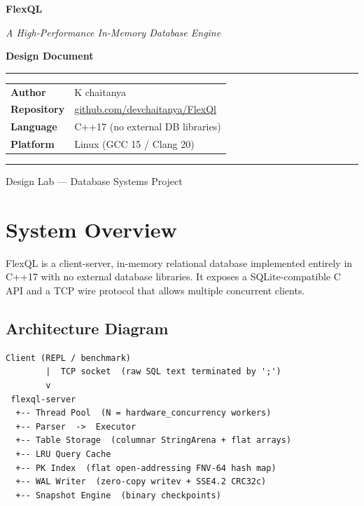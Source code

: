 \documentclass[12pt,a4paper]{article}
\begin{document}
\begin{titlepage}
\centering
\vspace*{3cm}
{\Huge\bfseries\color{sectiongray} FlexQL \par}
\vspace{0.4cm}
{\large\itshape A High-Performance In-Memory Database Engine \par}
\vspace{1.5cm}
{\normalsize\bfseries Design Document \par}
\vspace{0.5cm}
\hrule
\vspace{0.5cm}
{\small
\begin{tabular}{ll}
\textbf{Author}     & K chaitanya \\[2pt]
\textbf{Repository} & \href{https://github.com/devchaitanya/FlexQl}{github.com/devchaitanya/FlexQl} \\[2pt]
\textbf{Language}   & C++17 (no external DB libraries) \\[2pt]
\textbf{Platform}   & Linux (GCC 15 / Clang 20) \\[2pt]
\end{tabular}
}
\vspace{0.5cm}
\hrule
\vfill
{\small Design Lab — Database Systems Project}
\end{titlepage}

\tableofcontents
\newpage

\section{System Overview}

FlexQL is a client-server, in-memory relational database implemented entirely in C++17
with no external database libraries. It exposes a SQLite-compatible C API and a TCP
wire protocol that allows multiple concurrent clients.

\subsection*{Architecture Diagram}

\begin{lstlisting}[language={},title={High-level architecture}]
Client (REPL / benchmark)
        |  TCP socket  (raw SQL text terminated by ';')
        v
 flexql-server
  +-- Thread Pool  (N = hardware_concurrency workers)
  +-- Parser  ->  Executor
  +-- Table Storage  (columnar StringArena + flat arrays)
  +-- LRU Query Cache
  +-- PK Index  (flat open-addressing FNV-64 hash map)
  +-- WAL Writer  (zero-copy writev + SSE4.2 CRC32c)
  +-- Snapshot Engine  (binary checkpoints)
\end{lstlisting}
\end{document}

